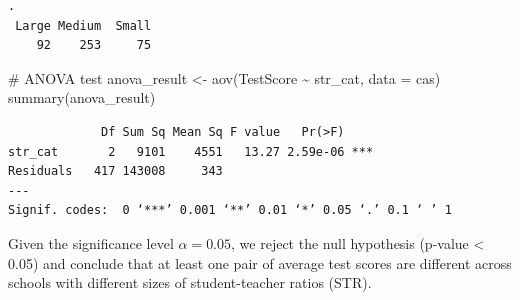 \documentclass[
  12pt,
  letterpaper,
]{scrbook}
\newenvironment{Shaded}{\begin{snugshade}}{\end{snugshade}}
\newcommand{\AttributeTok}[1]{\textcolor[rgb]{0.40,0.45,0.13}{#1}}
\newcommand{\CommentTok}[1]{\textcolor[rgb]{0.37,0.37,0.37}{#1}}
\newcommand{\DecValTok}[1]{\textcolor[rgb]{0.68,0.00,0.00}{#1}}
\newcommand{\FunctionTok}[1]{\textcolor[rgb]{0.28,0.35,0.67}{#1}}
\newcommand{\NormalTok}[1]{\textcolor[rgb]{0.00,0.23,0.31}{#1}}
\newcommand{\OtherTok}[1]{\textcolor[rgb]{0.00,0.23,0.31}{#1}}
\newcommand{\SpecialCharTok}[1]{\textcolor[rgb]{0.37,0.37,0.37}{#1}}
\newcommand{\StringTok}[1]{\textcolor[rgb]{0.13,0.47,0.30}{#1}}
\theoremstyle{plain}
\theoremstyle{definition}
\theoremstyle{remark}
\begin{document}
\begin{Shaded}
\end{Shaded}

\begin{verbatim}
.
 Large Medium  Small 
    92    253     75 
\end{verbatim}

\begin{Shaded}
\begin{Highlighting}[]
\CommentTok{\# ANOVA test}
\NormalTok{anova\_result }\OtherTok{\textless{}{-}} \FunctionTok{aov}\NormalTok{(TestScore }\SpecialCharTok{\textasciitilde{}}\NormalTok{ str\_cat, }\AttributeTok{data =}\NormalTok{ cas)}
\FunctionTok{summary}\NormalTok{(anova\_result)}
\end{Highlighting}
\end{Shaded}

\begin{verbatim}
             Df Sum Sq Mean Sq F value   Pr(>F)    
str_cat       2   9101    4551   13.27 2.59e-06 ***
Residuals   417 143008     343                     
---
Signif. codes:  0 ‘***’ 0.001 ‘**’ 0.01 ‘*’ 0.05 ‘.’ 0.1 ‘ ’ 1
\end{verbatim}

Given the significance level \(\alpha = 0.05\), we reject the null
hypothesis (p-value \textless{} 0.05) and conclude that at least one
pair of average test scores are different across schools with different
sizes of student-teacher ratios (STR).
\end{document}
